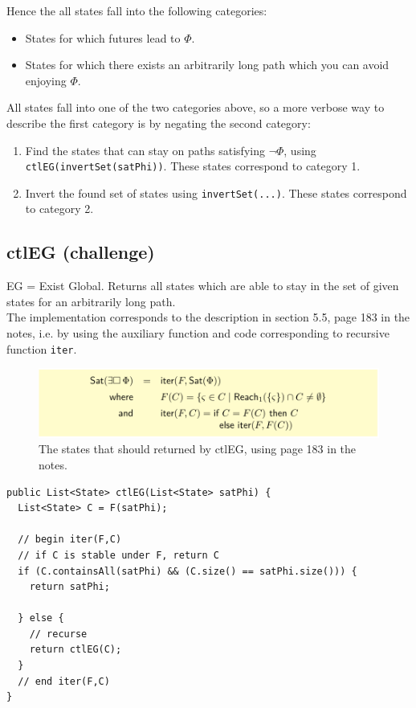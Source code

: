 Hence the all states fall into the following categories:

\begin{itemize}
    \item States for which futures lead to $\Phi$.
    
    \item States for which there exists an arbitrarily long path which you can avoid enjoying $\Phi$.
\end{itemize}

All states fall into one of the two categories above, so a more verbose way to describe the first category is by negating the second category:

\begin{enumerate}
    \item Find the states that can stay on paths satisfying $\neg \Phi$, using \texttt{ctlEG(invertSet(satPhi))}. These states correspond to category 1.
    \item Invert the found set of states using \texttt{invertSet(...)}. These states correspond to category 2. 
\end{enumerate}


\subsection{ctlEG (challenge)}
EG = Exist Global.
Returns all states which are able to stay in the set of given states for an arbitrarily long path. \\

The implementation corresponds to the description in section 5.5, page 183 in the notes, i.e. by using the auxiliary function  and code corresponding to recursive function \texttt{iter}.

\begin{figure}[H]
    \centering
    \includegraphics[width=1.0\textwidth]{fig/EG_def.PNG}
    \caption{The states that should returned by ctlEG, using page 183 in the notes.}
    \label{fig:EG_def}
\end{figure}


\begin{lstlisting}
public List<State> ctlEG(List<State> satPhi) {
  List<State> C = F(satPhi);

  // begin iter(F,C)
  // if C is stable under F, return C
  if (C.containsAll(satPhi) && (C.size() == satPhi.size())) {
    return satPhi;

  } else {
    // recurse
    return ctlEG(C);
  }
  // end iter(F,C)
}
\end{lstlisting}

